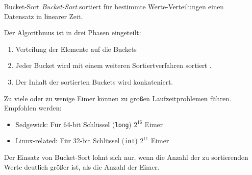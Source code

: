 \begin{algo}{Bucket-Sort}
    \emph{Bucket-Sort} sortiert für bestimmte Werte-Verteilungen einen Datensatz in linearer Zeit.

    Der Algorithmus ist in drei Phasen eingeteilt:
    \begin{enumerate}
        \item Verteilung der Elemente auf die Buckets
        \item Jeder Bucket wird mit einem weiteren Sortiertverfahren sortiert .
        \item Der Inhalt der sortierten Buckets wird konkateniert.
    \end{enumerate}

    Zu viele oder zu wenige Eimer können zu großen Laufzeitproblemen führen.
    Empfohlen werden:
    \begin{itemize}
        \item Sedgewick: Für 64-bit Schlüssel (\texttt{long}) $2^{16}$ Eimer
        \item Linux-related: Für 32-bit Schlüssel (\texttt{int}) $2^{11}$ Eimer
    \end{itemize}

    Der Einsatz von Bucket-Sort lohnt sich nur, wenn die Anzahl der zu sortierenden Werte deutlich größer ist, als die Anzahl der Eimer.
\end{algo}